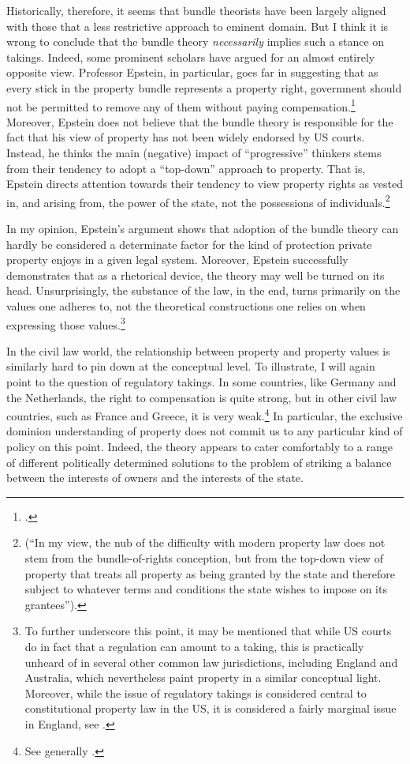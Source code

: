 Historically, therefore, it seems that bundle theorists have been largely aligned with those that  a less restrictive approach to eminent domain. But I think it is wrong to conclude that the bundle theory {\it necessarily} implies such a stance on takings. Indeed, some prominent scholars have argued for an almost entirely opposite view. Professor Epstein, in particular, goes far in suggesting that as every stick in the property bundle represents a property right, government should not be permitted to remove any of them without paying compensation.\footcite[232-233]{epstein11} Moreover, Epstein does not believe that the bundle theory is responsible for the fact that his view of property has not been widely endorsed by US courts. Instead, he thinks the main (negative) impact of ``progressive'' thinkers stems from their tendency to adopt a ``top-down'' approach to property. That is, Epstein directs attention towards their tendency to view property rights as vested in, and arising from, the power of the state, not the possessions of individuals.\footnote{\cite[227-228]{epstein11} (``In my view, the nub of the difficulty with modern property law does not stem from the bundle-of-rights conception, but from the top-down view of property that treats all property as being granted by the state and therefore subject to whatever terms and conditions the state wishes to impose on its grantees'').} 

In my opinion, Epstein's argument shows that adoption of the bundle theory can hardly be considered a determinate factor for the kind of protection private property enjoys in a given legal system. Moreover, Epstein successfully demonstrates that as a rhetorical device, the theory may well be turned on its head. Unsurprisingly, the substance of the law, in the end, turns primarily on the values one adheres to, not the theoretical constructions one relies on when expressing those values.\footnote{To further underscore this point, it may be mentioned that while US courts do in fact  that a regulation can amount to a taking, this is practically unheard of in several other common law jurisdictions, including England and Australia, which nevertheless paint property in a similar conceptual light. Moreover, while the issue of regulatory takings is considered central to constitutional property law in the US, it is considered a fairly marginal issue in England, see \cite{purdue10}.}

In the civil law world, the relationship between property  and property values is similarly hard to pin down at the conceptual level. To illustrate, I will again point to the question of regulatory takings. In some countries, like Germany and the Netherlands, the right to compensation is quite strong, but in other civil law countries, such as France and Greece, it is very weak.\footnote{See generally \cite{alterman10}.} In particular, the exclusive dominion understanding of property does not commit us to any particular kind of policy on this point. Indeed, the theory appears to cater comfortably to a range of different politically determined solutions to the problem of striking a balance between the interests of owners and the interests of the state. 

